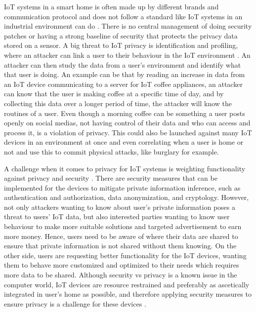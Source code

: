 \gls{IoT} systems in a smart home is often made up by different brands and communication protocol and does not follow a standard like \gls{IoT} systems in an industrial environment can do \cite{IoTPrivSecSmarthome}. There is no central management of doing security patches or having a strong baseline of security that protects the privacy data stored on a sensor. A big threat to \gls{IoT} privacy is identification and profiling, where an attacker can link a user to their behaviour in the \gls{IoT} environment \cite{IoTSecPrivSafeEth}. An attacker can then study the data from a user's environment and identify what that user is doing. An example can be that by reading an increase in data from an \gls{IoT} device communicating to a server for \gls{IoT} coffee appliances, an attacker can know that the user is making coffee at a specific time of day, and by collecting this data over a longer period of time, the attacker will know the routines of a user. Even though a morning coffee can be something a user posts openly on social medias, not having control of their data and who can access and process it, is a violation of privacy. This could also be launched against many \gls{IoT} devices in an environment at once and even correlating when a user is home or not and use this to commit physical attacks, like burglary for example. 

A challenge when it comes to privacy for \gls{IoT} systems is weighting functionality against privacy and security \cite{PrivacyIoTSurvey}. There are security measures that can be implemented for the devices to mitigate private information inference, such as authentication and authorization, data anonymization, and cryptology. However, not only attackers wanting to know about user's private information poses a threat to users' \gls{IoT} data, but also interested parties wanting to know user behaviour to make more suitable solutions and targeted advertisement to earn more money. Hence, users need to be aware of where their data are shared to ensure that private information is not shared without them knowing. On the other side, users are requesting better functionality for the \gls{IoT} devices, wanting them to behave more customized and optimized to their needs which requires more data to be shared. Although security vs privacy is a known issue in the computer world, \gls{IoT} devices are resource restrained and preferably as ascetically integrated in user's home as possible, and therefore applying security measures to ensure privacy is a challenge for these devices \cite{PrivacyIoTSurvey}. 

